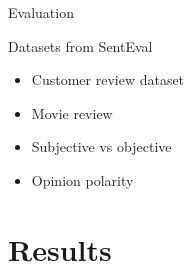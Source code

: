 \documentclass[xcolor={table}]{beamer}
\begin{document}
\begin{frame}{Evaluation}
    \begin{block}{Datasets from SentEval \cite{conneau2017supervised}}
        \begin{itemize}
            \item Customer review dataset
            \item Movie review
            \item Subjective vs objective
            \item Opinion polarity            
        \end{itemize}
    \end{block}
    
    
\end{frame} 

\section{Results}
\end{document}
